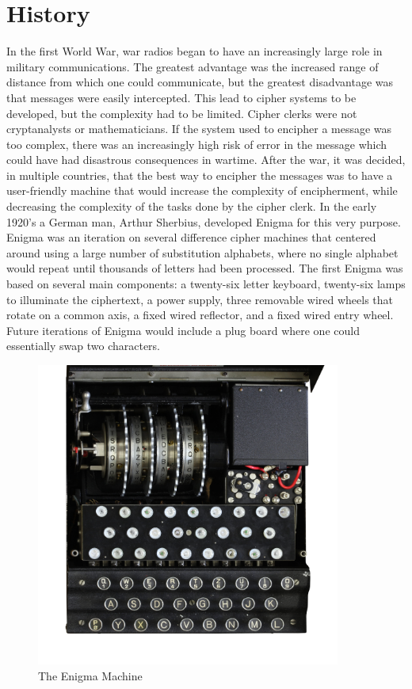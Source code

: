 \chapter{History}\label{chap:history}

In the first World War, war radios began to have an increasingly large role in military communications. The greatest advantage was the increased range of distance from which one could communicate, but the greatest disadvantage was that messages were easily intercepted. This lead to cipher systems to be developed, but the complexity had to be limited. Cipher clerks were not cryptanalysts or mathematicians. If the system used to encipher a message was too complex, there was an increasingly high risk of error in the message which could have had disastrous consequences in wartime. After the war, it was decided, in multiple countries, that the best way to encipher the messages was to have a user-friendly machine that would increase the complexity of encipherment, while decreasing the complexity of the tasks done by the cipher clerk. In the early 1920’s a German man, Arthur Sherbius, developed Enigma for this very purpose. Enigma was an iteration on several difference cipher machines that centered around using a large number of substitution alphabets, where no single alphabet would repeat until thousands of letters had been processed. The first Enigma was based on several main components: a twenty-six letter keyboard, twenty-six lamps to illuminate the ciphertext, a power supply, three removable wired wheels that rotate on a common axis, a fixed wired reflector, and a fixed wired entry wheel\cite{rfc01}. Future iterations of Enigma would include a plug board where one could essentially swap two characters.

\begin{figure}[h!]
\begin{centering}
  \includegraphics[height=10cm]{images/enigma.jpg}
  \caption{The Enigma Machine}
  \label{fig:machine1}
\end{centering}
\end{figure}

